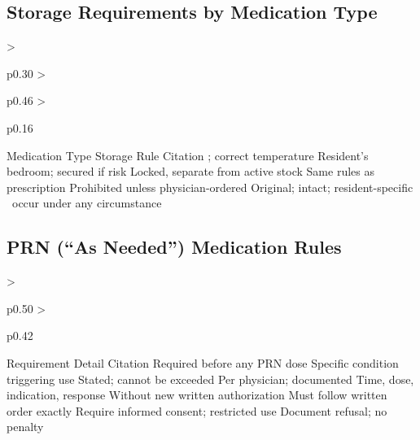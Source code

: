 \subsection{Storage Requirements by Medication Type}
\begin{cheattablethree}
  {>{\raggedright\arraybackslash}p{0.30\linewidth}
   >{\raggedright\arraybackslash}p{0.46\linewidth}
   >{\raggedright\arraybackslash}p{0.16\linewidth}}
  {Medication Type}
  {Storage Rule}
  {Citation}
    {\medCSStorage}
    {}
    {\medSchIIStorage}
    {}
    {\medRefrigStorage; correct temperature}
    {}
    {Resident's bedroom; secured if risk}
    {}
    {Locked, separate from active stock}
    {}
    {Same rules as prescription}
    {}
    {Prohibited unless physician-ordered}
    {}
    {Original; intact; resident-specific}
    {}
    {\shallnot\ occur under any circumstance}
    {}
\end{cheattablethree}

\subsection{PRN (``As Needed'') Medication Rules}
\begin{cheattable}
  {>{\raggedright\arraybackslash}p{0.50\linewidth}
   >{\raggedright\arraybackslash}p{0.42\linewidth}}
  {Requirement}
  {Detail \hfill Citation}
   {Required before any PRN dose \hfill {}}
   {\medPRNFields \hfill {}}
   {Specific condition triggering use \hfill {}}
   {Stated; cannot be exceeded \hfill {}}
   {Per physician; documented \hfill {}}
   {Time, dose, indication, response \hfill {}}
   {Without new written authorization \hfill {}}
   {Must follow written order exactly \hfill {}}
   {Require informed consent; restricted use \hfill {}}
   {Document refusal; no penalty \hfill {}}
\end{cheattable}

